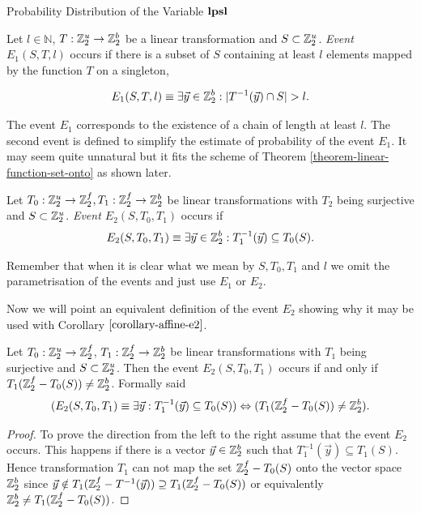 \begin{section}{Probability Distribution of the Variable \texorpdfstring{$\mathbf{lpsl}$}{lpsl}}
\begin{definition}
Let $l \in \mathbb{N}$, $T: \mathbb{Z}_{2}^{u} \rightarrow \mathbb{Z}_{2}^{b}$ be a linear transformation and $S \subset \mathbb{Z}_{2}^{u}$. \emph{Event $E_1(S, T, l)$} occurs if there is a subset of $S$ containing at least $l$ elements mapped by the function $T$ on a singleton,

\[ 
	E_1(S, T, l) \equiv \exists \vec{y} \in \mathbb{Z}_{2}^{b}: | T^{-1}(\vec{y}) \cap S | > l \text{.}
\]
\end{definition}
The event $E_1$ corresponds to the existence of a chain of length at least $l$. The second event is defined to simplify the estimate of probability of the event $E_1$. It may seem quite unnatural but it fits the scheme of Theorem \ref{theorem-linear-function-set-onto} as shown later.
\begin{definition}
Let $T_0: \mathbb{Z}_{2}^{u} \rightarrow \mathbb{Z}_{2}^{f}, T_1: \mathbb{Z}_{2}^{f} \rightarrow \mathbb{Z}_{2}^{b}$ be linear transformations with $T_2$ being surjective and $S \subset \mathbb{Z}_{2}^{u}$. \emph{Event $E_2(S, T_0, T_1)$} occurs if
\[
	E_2(S, T_0, T_1) \equiv \exists \vec{y} \in \mathbb{Z}_{2}^{b}: T_1^{-1}(\vec{y}) \subseteq T_0(S) \text{.}
\]
\end{definition}

Remember that when it is clear what we mean by $S, T_0, T_1$ and $l$ we omit the parametrisation of the events and just use $E_1$ or $E_2$.

Now we will point an equivalent definition of the event $E_2$ showing why it may be used with Corollary $\ref{corollary-affine-e2}$.
\begin{remark}
\label{remark-e2-equivalency}
Let $T_0: \mathbb{Z}_{2}^{u} \rightarrow \mathbb{Z}_{2}^{f}$, $T_1: \mathbb{Z}_{2}^{f} \rightarrow \mathbb{Z}_{2}^{b}$ be linear transformations with $T_1$ being surjective and $S \subset \mathbb{Z}_{2}^{u}$. Then the event $E_2(S, T_0, T_1)$ occurs if and only if $T_1(\mathbb{Z}_{2}^{f} - T_0(S)) \neq \mathbb{Z}_{2}^{b}$. Formally said
\[
	(E_2(S, T_0, T_1) \equiv \exists \vec{y}: T_1^{-1}(\vec{y}) \subseteq T_0(S)) \Leftrightarrow (T_1(\mathbb{Z}_{2}^{f} - T_0(S)) \neq \mathbb{Z}_{2}^{b}) \text{.}
\]
\end{remark}
\begin{proof}
To prove the direction from the left to the right assume that the event $E_2$ occurs. This happens if there is a vector $\vec{y} \in \mathbb{Z}_{2}^{b}$ such that $T_1^{-1}(\vec{y}) \subseteq T_1(S)$. Hence transformation $T_1$ can not map the set $\mathbb{Z}_{2}^{f} - T_0(S)$ onto the vector space $\mathbb{Z}_{2}^{b}$ since $\vec{y} \notin T_1(\mathbb{Z}_{2}^{f} - T^{-1}(\vec{y})) \supseteq T_1(\mathbb{Z}_{2}^{f} - T_0(S))$ or equivalently $\mathbb{Z}_{2}^{b} \neq T_1(\mathbb{Z}_{2}^{f} - T_0(S))$.


\end{proof}
\end{section}
